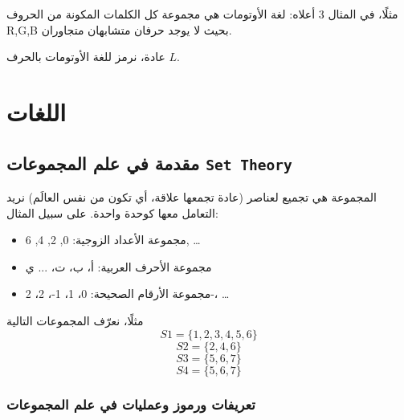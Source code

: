 \documentclass[12pt]{article}
\begin{document}
مثلًا، في المثال 3 أعلاه: لغة الأوتومات هي مجموعة كل الكلمات المكونة من الحروف R,G,B بحيث لا يوجد حرفان متشابهان متجاوران.

عادة، نرمز للغة الأوتومات بالحرف $L$.

\section{اللغات}

\subsection{مقدمة في علم المجموعات \textenglish{\texttt{Set Theory}}}

المجموعة هي تجميع لعناصر  (عادة تجمعها علاقة، أي تكون من نفس العالَم) نريد التعامل معها كوحدة واحدة. على سبيل المثال:
\begin{itemize}
    \item مجموعة الأعداد الزوجية: {0, 2, 4, 6, \ldots}
    \item مجموعة الأحرف العربية: {أ، ب، ت، ... ي}
    \item مجموعة الأرقام الصحيحة: {0، 1، 1-، 2، 2-، \ldots}
\end{itemize}

مثلًا، نعرّف المجموعات التالية
$$S1 = \{ 1, 2, 3, 4, 5, 6 \}$$
$$S2 = \{ 2, 4, 6 \}$$
$$S3 = \{ 5, 6, 7 \}$$
$$S4 = \{ 5, 6, 7 \}$$

\subsubsection{تعريفات ورموز وعمليات في علم المجموعات}
\end{document}
